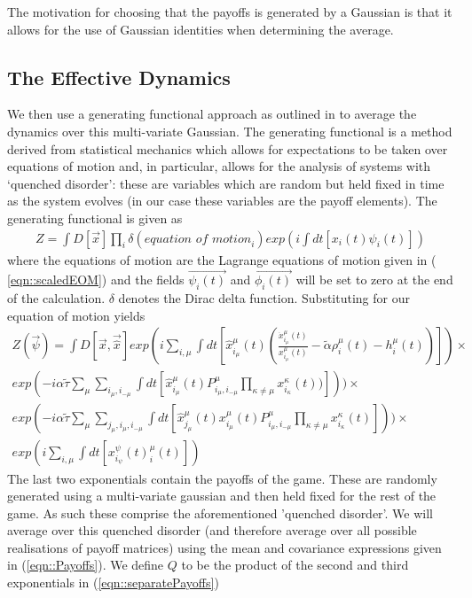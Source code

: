 \documentclass[sigconf,anonymous]{aamas}
\newcommand{\xmu}[2]{x_{#1_#2}^{#2}(t)}
\newcommand{\payoff}[2]{P^{#2}_{#1_#2, #1_{-#2}}}
\newcommand{\dxmu}[1]{\dot{x}_{#1_\mu}^{\mu} (t)}
\newcommand{\hxmu}[1]{\hat{x}_{#1_\mu}^{\mu} (t)}
\newcommand{\talpha}{\tilde{\alpha}}
\newcommand{\ttau}{\tilde{\tau}}
\begin{document}
The motivation for choosing that the payoffs is generated by a
Gaussian is that it allows for the use of Gaussian identities when
determining the average.

\subsection{The Effective Dynamics}

We then use a generating functional approach as outlined in
\cite{Mezard1986} to average the dynamics over this multi-variate
Gaussian. The generating functional is a method derived from
statistical mechanics which allows for expectations to be taken over
equations of motion and, in particular, allows for the analysis of
systems with `quenched disorder': these are
variables which are random but held fixed in time as the system
evolves (in our case these variables are the payoff elements). The
generating functional is given as \cite{Mezard1986}
%
\begin{eqnarray}
	Z  =  \int D[\Vec{x}] \prod_i \delta(\textit{equation of
          motion}_i) exp(i \int dt[x_i(t) \psi_i(t)])
\end{eqnarray}
%
where the equations of motion are the Lagrange equations of motion
given in ( \ref{eqn::scaledEOM}) and the fields $\Vec{\psi_i(t)}$ and
$\Vec{\phi_i(t)}$ will be set to zero at the end of the
calculation. $\delta$ denotes the Dirac delta function. Substituting
for our equation of motion yields
%
{\small
\begin{equation}
\label{eqn::separatePayoffs}
	\begin{split}
	Z(\Vec{\psi}) = \int D[\Vec{x}, \Vec{\hat{x}}] exp( i \sum_{i, \mu} \int dt [ \hxmu{i} (\frac{\dxmu{i}}{\xmu{i}{\mu}} - \talpha \rho_i^\mu (t) - h_i^\mu (t))]) \times \\ exp(-i \alpha \ttau \sum_{\mu} \sum_{i_\mu, i_{-\mu}} \int dt [\hxmu{i} \payoff{i}{\mu} \prod_{\kappa \neq \mu} \xmu{i}{\kappa} )])) 
    \times \\ exp(-i \alpha \ttau \sum_{\mu} \sum_{j_\mu, i_\mu, i_{-\mu}} \int dt [\hxmu{j}  \xmu{i}{\mu} \payoff{i}{\mu} \prod_{\kappa \neq \mu} \xmu{i}{\kappa}])) 
	\times \\ exp(i \sum_{i, \mu}
	\int dt[\xmu{i} \psi^\mu_i(t)])
\end{split}
\end{equation}
}
The last two exponentials contain the payoffs of the game. These are randomly generated using a multi-variate gaussian and then held fixed for the rest of the game. As such these comprise the aforementioned 'quenched disorder'. We will average over this quenched disorder (and therefore average over all possible realisations of payoff matrices) using the mean and covariance expressions given in (\ref{eqn::Payoffs}). We define $Q$ to be the product of the second and third exponentials in (\ref{eqn::separatePayoffs}) 
\end{document}
